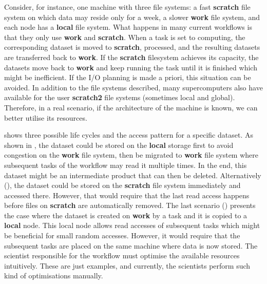 \documentclass{superfri}
\begin{document}
Consider, for instance, one machine with three file systems: a fast \textbf{scratch} file system on which data may reside only for a week, a slower \textbf{work} file system, and each node has a \textbf{local} file system.
What happens in many current workflows is that they only use \textbf{work} and \textbf{scratch}.
When a task is set to computing, the corresponding dataset is moved to \textbf{scratch}, processed, and the resulting datasets are transferred back to \textbf{work}.
If the \textbf{scratch} filesystem achieves its capacity, the datasets move back to \textbf{work} and keep running the task until it is finished which might be inefficient.
If the I/O planning is made a priori, this situation can be avoided.
In addition to the file systems described, many supercomputers also have available for the user \textbf{scratch2} file systems (sometimes local and global).
Therefore, in a real scenario, if the architecture of the machine is known, we can better utilise its resources.

 shows three possible life cycles and the access pattern for a specific dataset.
As shown in , the dataset could be stored on the \textbf{local} storage first to avoid congestion on the \textbf{work} file system, then be migrated to \textbf{work} file system where subsequent tasks of the workflow may read it multiple times.
In the end, this dataset might be an intermediate product that can then be deleted.
Alternatively (), the dataset could be stored on the \textbf{scratch} file system immediately and accessed there.
However, that would require that the last read access happens before files on \textbf{scratch} are automatically removed.
The last scenario () presents the case where the dataset is created on \textbf{work} by a task and it is copied to a \textbf{local} node. This local node allows read accesses of subsequent tasks which might be beneficial for small random accesses.
However, it would require that the subsequent tasks are placed on the same machine where data is now stored.
The scientist responsible for the workflow must optimise the available resources intuitively.
These are just examples, and currently, the scientists perform such kind of optimisations manually.
\end{document}
